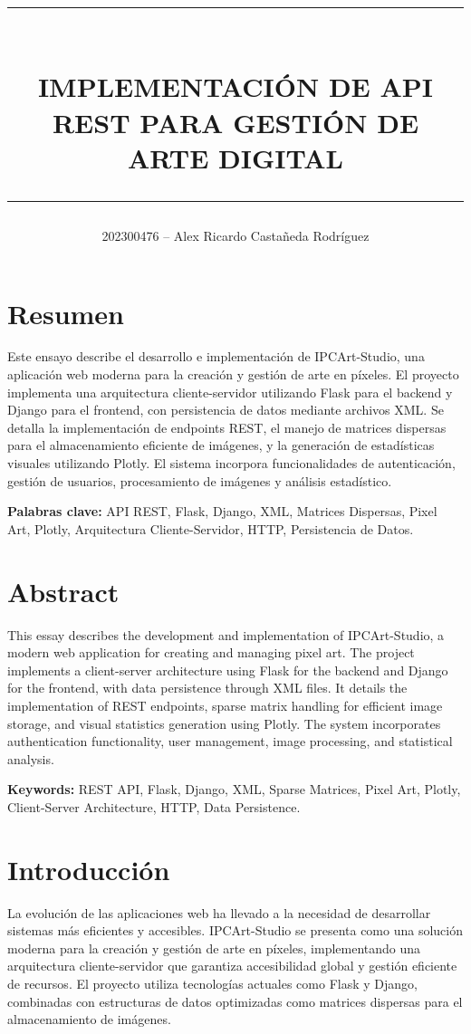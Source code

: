 \documentclass[letterpaper,12pt]{article}
\title{
    \rule{\textwidth}{0.4pt} \\
    \vspace{0.4cm}
    \textbf{IMPLEMENTACIÓN DE API REST PARA GESTIÓN DE ARTE DIGITAL} \\
    \rule{\textwidth}{0.4pt}
}
\author{202300476 – Alex Ricardo Castañeda Rodríguez}
\date{}
\begin{document}
\maketitle
\vspace{1cm}

\begin{multicols}{2}

    \section*{Resumen}
    Este ensayo describe el desarrollo e implementación de IPCArt-Studio, una aplicación web moderna para la creación y gestión de arte en píxeles. El proyecto implementa una arquitectura cliente-servidor utilizando Flask para el backend y Django para el frontend, con persistencia de datos mediante archivos XML. Se detalla la implementación de endpoints REST, el manejo de matrices dispersas para el almacenamiento eficiente de imágenes, y la generación de estadísticas visuales utilizando Plotly. El sistema incorpora funcionalidades de autenticación, gestión de usuarios, procesamiento de imágenes y análisis estadístico.

    \textbf{Palabras clave:} API REST, Flask, Django, XML, Matrices Dispersas, Pixel Art, Plotly, Arquitectura Cliente-Servidor, HTTP, Persistencia de Datos.

    \columnbreak

    \section*{Abstract}
    This essay describes the development and implementation of IPCArt-Studio, a modern web application for creating and managing pixel art. The project implements a client-server architecture using Flask for the backend and Django for the frontend, with data persistence through XML files. It details the implementation of REST endpoints, sparse matrix handling for efficient image storage, and visual statistics generation using Plotly. The system incorporates authentication functionality, user management, image processing, and statistical analysis.

    \textbf{Keywords:} REST API, Flask, Django, XML, Sparse Matrices, Pixel Art, Plotly, Client-Server Architecture, HTTP, Data Persistence.

    \section*{Introducción}
    La evolución de las aplicaciones web ha llevado a la necesidad de desarrollar sistemas más eficientes y accesibles. IPCArt-Studio se presenta como una solución moderna para la creación y gestión de arte en píxeles, implementando una arquitectura cliente-servidor que garantiza accesibilidad global y gestión eficiente de recursos. El proyecto utiliza tecnologías actuales como Flask y Django, combinadas con estructuras de datos optimizadas como matrices dispersas para el almacenamiento de imágenes.


\end{multicols}
\end{document}
